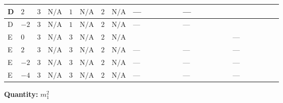 \documentclass[8pt]{article}
\begin{document}
\begin{landscape}
\begin{longtable}{@{}llcccccc >{\raggedright\arraybackslash}p{0.21\linewidth} >{\raggedright\arraybackslash}p{0.21\linewidth} >{\raggedright\arraybackslash}p{0.21\linewidth}@{}}
\midrule
D & $2$ & $3$ & $\text{N/A}$ & $1$ & $\text{N/A}$ & $2$ & $\text{N/A}$ & --- & --- & \scriptsize\adjustbox{max width=\linewidth}{$\begin{gathered} +2 {\lambda_{12}^{(1)}} {m_2^2}\end{gathered}$} \\
\midrule
D & $-2$ & $3$ & $\text{N/A}$ & $1$ & $\text{N/A}$ & $2$ & $\text{N/A}$ & --- & --- & \scriptsize\adjustbox{max width=\linewidth}{$\begin{gathered} +2 {\lambda_{12}^{(1)}} {m_2^2}\end{gathered}$} \\
\midrule
E & $0$ & $3$ & $\text{N/A}$ & $3$ & $\text{N/A}$ & $2$ & $\text{N/A}$ & \scriptsize\adjustbox{max width=\linewidth}{$\begin{gathered} 20 {\mu_{\mathrm{T3GeneralS1Sq}}} \left({\lambda_{X_{9}}}\right)^{*}\end{gathered}$} & \scriptsize\adjustbox{max width=\linewidth}{$\begin{gathered} +20 {\lambda_{X_{9}}} \left({\mu_{\mathrm{T3GeneralS1Sq}}}\right)^{*}\end{gathered}$} & --- \\
\midrule
E & $2$ & $3$ & $\text{N/A}$ & $3$ & $\text{N/A}$ & $2$ & $\text{N/A}$ & --- & --- & --- \\
\midrule
E & $-2$ & $3$ & $\text{N/A}$ & $3$ & $\text{N/A}$ & $2$ & $\text{N/A}$ & --- & --- & --- \\
\midrule
E & $-4$ & $3$ & $\text{N/A}$ & $3$ & $\text{N/A}$ & $2$ & $\text{N/A}$ & --- & --- & --- \\
\midrule
\bottomrule
\end{longtable}
\clearpage
\noindent\textbf{Quantity: }$m_1^2$\par\smallskip

\end{landscape}
\end{document}
